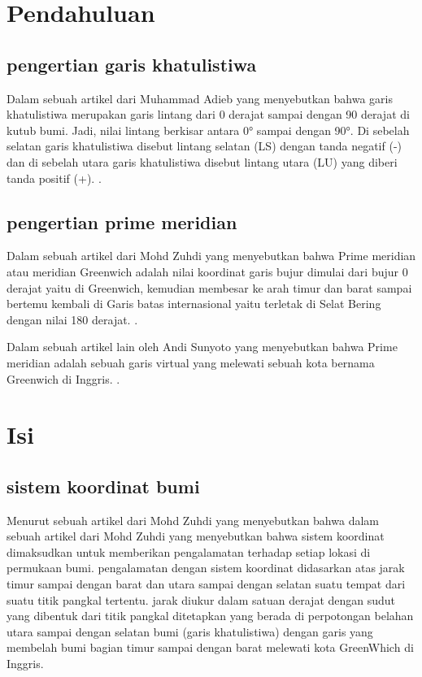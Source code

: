    
						

														   
\section {Pendahuluan}

\subsection{pengertian garis khatulistiwa}	

	Dalam sebuah artikel dari Muhammad Adieb yang menyebutkan bahwa garis khatulistiwa merupakan garis lintang dari 0 derajat sampai dengan 90 derajat 
di kutub bumi. Jadi, nilai lintang berkisar antara 0° sampai dengan 90°. Di sebelah selatan garis khatulistiwa disebut lintang selatan (LS) dengan 
tanda negatif (-) dan di sebelah utara garis khatulistiwa disebut lintang utara (LU) yang diberi tanda positif (+). \cite {adieb2014studi}.

\subsection{pengertian prime meridian}
	
	Dalam sebuah artikel dari Mohd Zuhdi yang menyebutkan bahwa Prime meridian atau meridian Greenwich adalah nilai koordinat garis bujur dimulai dari 
bujur 0 derajat yaitu di Greenwich, kemudian membesar ke arah timur dan barat sampai bertemu kembali di Garis batas internasional yaitu terletak 
di Selat Bering dengan nilai 180 derajat. \cite {zuhdi2012sistem}.

	Dalam sebuah artikel lain oleh Andi Sunyoto yang menyebutkan bahwa Prime meridian adalah sebuah garis virtual yang melewati sebuah kota 
bernama Greenwich di Inggris. \cite{sunyoto2009api}.

\section {Isi}

\subsection{sistem koordinat bumi}
	
	Menurut sebuah artikel dari Mohd Zuhdi yang menyebutkan bahwa dalam sebuah artikel dari Mohd Zuhdi yang menyebutkan bahwa sistem koordinat dimaksudkan 
untuk memberikan pengalamatan terhadap setiap lokasi di permukaan bumi. pengalamatan dengan sistem koordinat didasarkan atas jarak timur sampai dengan barat 
dan utara sampai dengan selatan suatu tempat dari suatu titik pangkal tertentu. jarak diukur dalam satuan derajat dengan sudut yang dibentuk dari titik 
pangkal ditetapkan yang berada di perpotongan belahan utara sampai dengan selatan bumi (garis khatulistiwa) dengan garis yang membelah bumi bagian timur sampai 
dengan barat melewati kota GreenWhich di Inggris.

